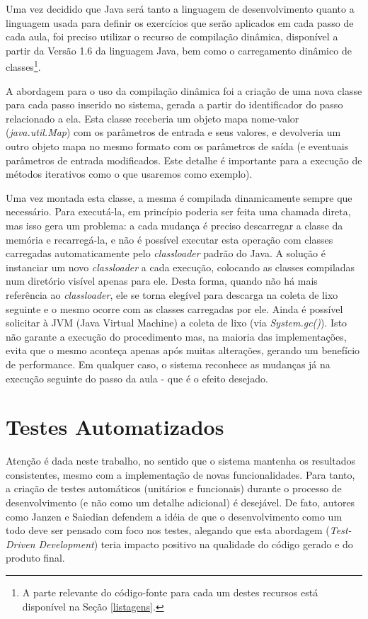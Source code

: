 \documentclass{abnt}
\begin{document}
	Uma vez decidido que Java será tanto a linguagem de desenvolvimento quanto a linguagem usada para definir os exercícios que serão aplicados em cada passo de cada aula, foi preciso utilizar o recurso de compilação dinâmica, disponível a partir da Versão 1.6 da linguagem Java, bem como o carregamento dinâmico de classes\footnote{A parte relevante do código-fonte para cada um destes recursos está disponível na Seção \ref{listagens}.}.

	A abordagem para o uso da compilação dinâmica foi a criação de uma nova classe para cada passo inserido no sistema, gerada a partir do identificador do passo relacionado a ela. Esta classe receberia um objeto mapa nome-valor (\textit{java.util.Map}) com os parâmetros de entrada e seus valores, e devolveria um outro objeto mapa no mesmo formato com os parâmetros de saída (e eventuais parâmetros de entrada modificados.  Este detalhe é importante para a execução de métodos iterativos como o que usaremos como exemplo).

	Uma vez montada esta classe, a mesma é compilada dinamicamente sempre que necessário. Para executá-la, em princípio poderia ser feita uma chamada direta, mas isso gera um problema: a cada mudança é preciso descarregar a classe da memória e recarregá-la, e não é possível executar esta operação com classes carregadas automaticamente pelo \textit{classloader} padrão do Java. A solução é instanciar um novo \textit{classloader} a cada execução, colocando as classes compiladas num diretório visível apenas para ele. Desta forma, quando não há mais referência ao \textit{classloader}, ele se torna elegível para descarga na coleta de lixo seguinte e o mesmo ocorre com as classes carregadas por ele. Ainda é possível solicitar à JVM (Java Virtual Machine) a coleta de lixo (via \textit{System.gc()}). Isto não garante a execução do procedimento mas, na maioria das implementações, evita que o mesmo aconteça apenas após muitas alterações, gerando um benefício de performance. Em qualquer caso, o sistema reconhece as mudanças já na execução seguinte do passo da aula - que é o efeito desejado.


\section{Testes Automatizados}

	Atenção é dada neste trabalho, no sentido que o sistema mantenha os resultados consistentes, mesmo com a implementação de novas funcionalidades. Para tanto, a criação de testes automáticos (unitários e funcionais) durante o processo de desenvolvimento (e não como um detalhe adicional) é desejável. De fato, autores como Janzen e Saiedian\cite{Janzen_Saiedian} defendem a idéia de que o desenvolvimento como um todo deve ser pensado com foco nos testes, alegando que esta abordagem (\textit{Test-Driven Development}) teria impacto positivo na qualidade do código gerado e do produto final.
\end{document}
